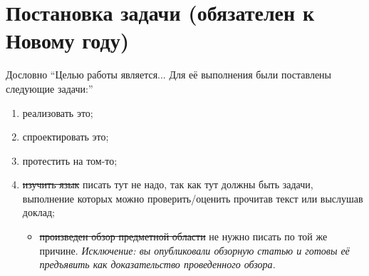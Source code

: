 
\section{Постановка задачи (обязателен к Новому году)}
\label{sec:task}
 Дословно \enquote{Целью работы является... Для её выполнения были постав\-лены следующие задачи:}
 \begin{enumerate}
 \item  реализовать это;
 \item  спроектировать это;
 \item  протестить на том-то;
 \item \sout{изучить язык \OCaml{}} писать тут не надо, так как тут должны быть задачи, выполнение которых можно проверить/оценить прочитав текст или выслушав доклад;
   \begin{itemize}
   \item \sout{произведен обзор предметной области} не нужно писать по той же причине. \emph{Исключение: вы опубликовали обзорную статью и готовы её предъявить как доказательство проведенного обзора.}
   \end{itemize}
 \end{enumerate}
